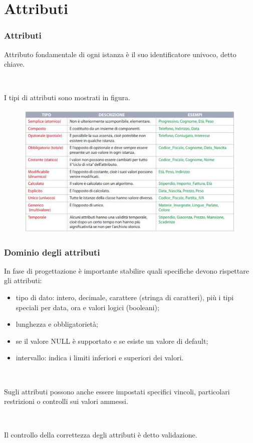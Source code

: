 \documentclass[]{beamer}
\begin{document}
\section{Attributi}

\begin{frame}
\frametitle{Attributi}
Attributo fondamentale di ogni istanza è il suo identificatore univoco, detto \alert<1>{chiave}.\pause

~

I tipi di attributi sono mostrati in figura.
\begin{figure}
  \includegraphics[width=.9\columnwidth]{img/tabellaattributi.png}
\end{figure}
\end{frame}


\begin{frame}
\frametitle{Dominio degli attributi}
In fase di progettazione è importante stabilire quali specifiche devono rispettare gli attributi:
\begin{itemize}
  \item tipo di dato: intero, decimale, carattere (stringa di caratteri), più i tipi speciali per data, ora e valori logici (booleani);\pause
  \item lunghezza e obbligatorietà;\pause
  \item se il valore NULL è supportato e se esiste un valore di default;\pause
  \item intervallo: indica i limiti inferiori e superiori dei valori.
\end{itemize}\pause

~

Sugli attributi possono anche essere impostati specifici \alert<5>{vincoli}, particolari restrizioni o controlli sui valori ammessi.

~

Il controllo della correttezza degli attributi è detto \alert<6>{validazione}.
\end{frame}
\end{document}
